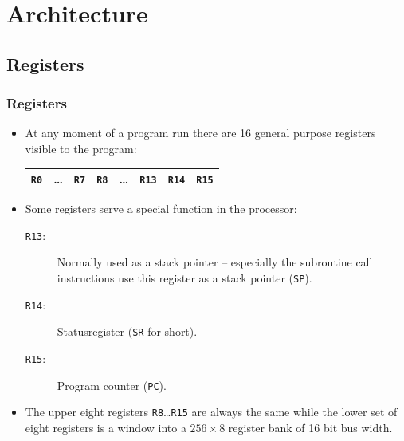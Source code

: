 \documentclass{beamer}
\begin{document}
 \section{Architecture}
  \subsection{Registers}
   \begin{frame}
    \frametitle{Registers}
    \begin{itemize}
     \item At any moment of a program run there are 16 general purpose 
      registers visible to the program:
      \begin{center}
       \begin{tabular}{|c|c|c||c|c|c|c|c|}
        \hline
         {\tt R0}&\dots&{\tt R7}&{\tt R8}&\dots&{\tt R13}&{\tt R14}&{\tt R15}\\
        \hline
       \end{tabular}
      \end{center}
     \item Some registers serve a special function in the processor:
      \begin{description}
       \item [{\tt R13}:] Normally used as a stack pointer -- especially the
        subroutine call instructions use this register as a stack pointer
        (\texttt{SP}).
       \item [{\tt R14}:] Statusregister ({\tt SR} for short).
       \item [{\tt R15}:] Program counter (\texttt{PC}).
      \end{description}
     \item The upper eight registers {\tt R8}\dots{\tt R15} are always the
      same while the lower set of eight registers is a window
      into a $256\times 8$ register bank of 16 bit bus width.
    \end{itemize}
   \end{frame}
%
\end{document}

